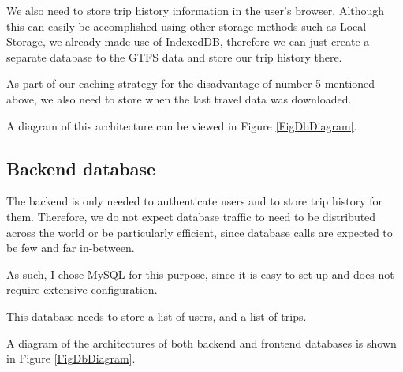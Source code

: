 We also need to store trip history information in the user's browser. Although this can easily be accomplished using other storage methods such as Local Storage, we already made use of IndexedDB, therefore we can just create a separate database to the GTFS data and store our trip history there.

As part of our caching strategy for the disadvantage of number 5 mentioned above, we also need to store when the last travel data was downloaded.

A diagram of this architecture can be viewed in Figure \ref{FigDbDiagram}.

\subsection{Backend database}
The backend is only needed to authenticate users and to store trip history for them. Therefore, we do not expect database traffic to need to be distributed across the world or be particularly efficient, since database calls are expected to be few and far in-between.

As such, I chose MySQL for this purpose, since it is easy to set up and does not require extensive configuration.

This database needs to store a list of users, and a list of trips.


A diagram of the architectures of both backend and frontend databases is shown in Figure \ref{FigDbDiagram}.


